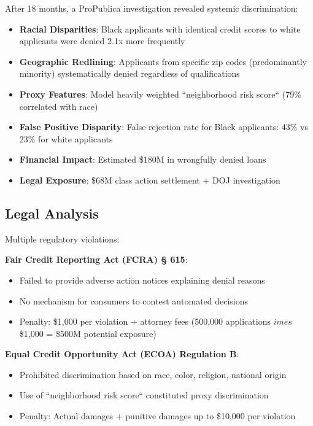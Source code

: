 After 18 months, a ProPublica investigation revealed systemic discrimination:
\begin{itemize}
    \item \textbf{Racial Disparities}: Black applicants with identical credit scores to white applicants were denied 2.1x more frequently
    \item \textbf{Geographic Redlining}: Applicants from specific zip codes (predominantly minority) systematically denied regardless of qualifications
    \item \textbf{Proxy Features}: Model heavily weighted ``neighborhood risk score`` (79\% correlated with race)
    \item \textbf{False Positive Disparity}: False rejection rate for Black applicants: 43\% vs 23\% for white applicants
    \item \textbf{Financial Impact}: Estimated \$180M in wrongfully denied loans
    \item \textbf{Legal Exposure}: \$68M class action settlement + DOJ investigation
\end{itemize}

\subsection{Legal Analysis}

Multiple regulatory violations:

\textbf{Fair Credit Reporting Act (FCRA) § 615}:
\begin{itemize}
    \item Failed to provide adverse action notices explaining denial reasons
    \item No mechanism for consumers to contest automated decisions
    \item Penalty: \$1,000 per violation + attorney fees (500,000 applications $	imes$ \$1,000 = \$500M potential exposure)
\end{itemize}

\textbf{Equal Credit Opportunity Act (ECOA) Regulation B}:
\begin{itemize}
    \item Prohibited discrimination based on race, color, religion, national origin
    \item Use of ``neighborhood risk score`` constituted proxy discrimination
    \item Penalty: Actual damages + punitive damages up to \$10,000 per violation
\end{itemize}

